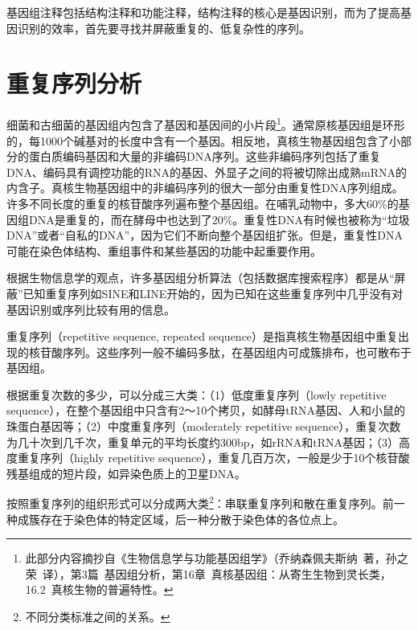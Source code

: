 \documentclass[11pt,a4paper,twoside]{book}
\begin{document}
基因组注释包括结构注释和功能注释，结构注释的核心是基因识别，而为了提高基因识别的效率，首先要寻找并屏蔽重复的、低复杂性的序列。

\section{重复序列分析}
细菌和古细菌的基因组内包含了基因和基因间的小片段\footnote{此部分内容摘抄自《生物信息学与功能基因组学》（乔纳森\textbullet 佩夫斯纳\ 著，孙之荣\ 译），第3篇\ 基因组分析，第16章\ 真核基因组：从寄生生物到灵长类，16.2\ 真核生物的普遍特性。}。通常原核基因组是环形的，每1000个碱基对的长度中含有一个基因。相反地，真核生物基因组包含了小部分的蛋白质编码基因和大量的非编码DNA序列。这些非编码序列包括了重复DNA、编码具有调控功能的RNA的基因、外显子之间的将被切除出成熟mRNA的内含子。真核生物基因组中的非编码序列的很大一部分由重复性DNA序列组成。许多不同长度的重复的核苷酸序列遍布整个基因组。在哺乳动物中，多大60\%的基因组DNA是重复的，而在酵母中也达到了20\%。重复性DNA有时候也被称为“垃圾DNA”或者“自私的DNA”，因为它们不断向整个基因组扩张。但是，重复性DNA可能在染色体结构、重组事件和某些基因的功能中起重要作用。

根据生物信息学的观点，许多基因组分析算法（包括数据库搜索程序）都是从“屏蔽”已知重复序列如SINE和LINE开始的，因为已知在这些重复序列中几乎没有对基因识别或序列比较有用的信息。

重复序列（repetitive sequence, repeated sequence）是指真核生物基因组中重复出现的核苷酸序列。这些序列一般不编码多肽，在基因组内可成簇排布，也可散布于基因组。

根据重复次数的多少，可以分成三大类：（1）低度重复序列（lowly repetitive sequence），在整个基因组中只含有2～10个拷贝，如酵母tRNA基因、人和小鼠的珠蛋白基因等；（2）中度重复序列（moderately repetitive sequence），重复次数为几十次到几千次，重复单元的平均长度约300bp，如rRNA和tRNA基因；（3）高度重复序列（highly repetitive sequence），重复几百万次，一般是少于10个核苷酸残基组成的短片段，如异染色质上的卫星DNA。

按照重复序列的组织形式可以分成两大类\footnote{不同分类标准之间的关系。}：串联重复序列和散在重复序列。前一种成簇存在于染色体的特定区域，后一种分散于染色体的各位点上。
\end{document}
